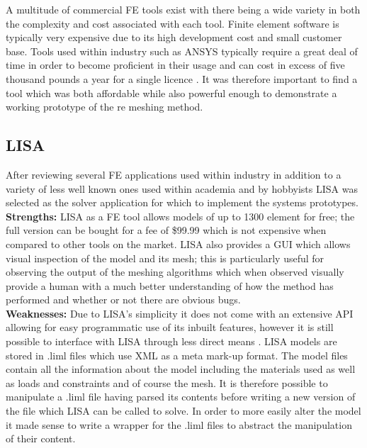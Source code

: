 \documentclass{article}
\begin{document}
\noindent
A multitude of commercial FE tools exist with there being a wide variety in both the complexity and cost associated with each tool. 
Finite element software is typically very expensive due to its high development cost and small customer base. Tools used within industry such as ANSYS typically require a great deal of time in order to become proficient in their usage and can cost in excess of five thousand pounds a year for a single licence \cite{AnsysCost}. It was therefore important to find a tool which was both affordable while also powerful enough to demonstrate a working prototype of the re meshing method.
 
\subsection{LISA}
After reviewing several FE applications used within industry in addition to a variety of less well known ones used within academia and by hobbyists LISA  was selected as the solver application for which to implement  the systems prototypes. \\ 

\noindent
\textbf{Strengths: }LISA as a FE tool allows models of up to 1300 element for free; the full version can be bought for a fee of \$99.99 \cite{LISAWebsite} which is not expensive when compared to other tools on the market. LISA also provides a GUI which allows visual inspection of the model and its mesh; this is particularly useful for observing the output of the meshing algorithms which when observed visually provide a human with a much better understanding of how the method has performed and whether or not there are obvious bugs. \\ 

\noindent
\textbf{Weaknesses: } Due to LISA’s simplicity it does not come with an extensive API allowing for easy programmatic use of its inbuilt features, however it is still possible to interface with LISA through less direct means \cite{LISAManual}. LISA models are stored in .liml files which use XML as a meta mark-up format. The model files contain all the information about the model including the materials used as well as loads and constraints and of course the mesh. It is therefore possible to manipulate a .liml file having parsed its contents before writing a new version of the file which LISA can be called to solve. In order to more easily alter the model it made sense to write a wrapper  for the .liml files to abstract the manipulation of their content.
\end{document}
